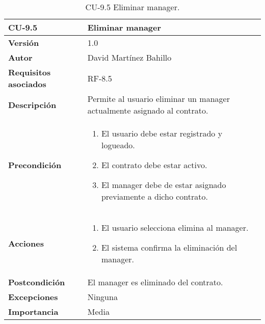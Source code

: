 \begin{table}[p]
	\centering
	\begin{tabularx}{\linewidth}{ p{} p{} }
		\toprule
		\textbf{CU-9.5}  & \textbf{Eliminar manager}\\
		\midrule
		\textbf{Versión}              & 1.0    \\
		\textbf{Autor}                & David Martínez Bahillo \\
		\textbf{Requisitos asociados} & RF-8.5 \\
		\textbf{Descripción}          & Permite al usuario eliminar un manager actualmente asignado al contrato. \\
		\textbf{Precondición}         &  
		\begin{enumerate}
			\item El usuario debe estar registrado y logueado.
			\item El contrato debe estar activo.
			\item El manager debe de estar asignado previamente a dicho contrato.
		\end{enumerate}\\
		\textbf{Acciones}             &
		\begin{enumerate}
			\item El usuario selecciona elimina al manager.
			\item El sistema confirma la eliminación del manager.
		\end{enumerate}\\
		\textbf{Postcondición}        & El manager es eliminado del contrato. \\
		\textbf{Excepciones}          & Ninguna \\
		\textbf{Importancia}          & Media \\
		\bottomrule
	\end{tabularx}
	\caption{CU-9.5 Eliminar manager.}
\end{table}


